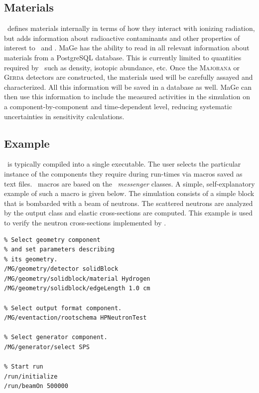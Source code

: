 \documentclass[article]{IEEEtran}
\begin{document}
\subsection{Materials}
\label{se:materials}

\GF\ defines materials internally in terms of how they interact 
with ionizing radiation, but \MaGe{} adds information about radioactive contaminants and other properties 
of interest to \MJ\ and \Gerda.
{\sc MaGe} has the ability to read in all
relevant information about materials from a PostgreSQL database. This
is currently limited to quantities required by \GF\ such as density, isotopic
abundance, etc. Once the \textsc{Majorana} or \textsc{Gerda} 
detectors are constructed,
the materials used will be carefully assayed and
characterized. All this information will be saved in a database as
well. {\sc MaGe} can then use this information to include the measured
activities in the simulation on a component-by-component and time-dependent level,
reducing systematic uncertainties in sensitivity calculations. \\

\subsection{Example}
\label{se:simple_example}

\MaGe\ is typically compiled into a single executable. 
The user selects the particular instance of the components they require during run-times via macros saved as text files. 
\MaGe\ macros are based on the \GF\ \emph{messenger} classes. A simple, self-explanatory example of such a macro is given below. The simulation consists of a simple block that is bombarded with a beam of neutrons. The scattered neutrons are analyzed by the output class and elastic cross-sections are computed. This example is used to verify the neutron cross-sections implemented by \GF.

{\small
\begin{verbatim}
% Select geometry component
% and set parameters describing 
% its geometry.
/MG/geometry/detector solidBlock
/MG/geometry/solidblock/material Hydrogen
/MG/geometry/solidblock/edgeLength 1.0 cm

% Select output format component.
/MG/eventaction/rootschema HPNeutronTest

% Select generator component.
/MG/generator/select SPS

% Start run
/run/initialize
/run/beamOn 500000
\end{verbatim}
}
\end{document}
